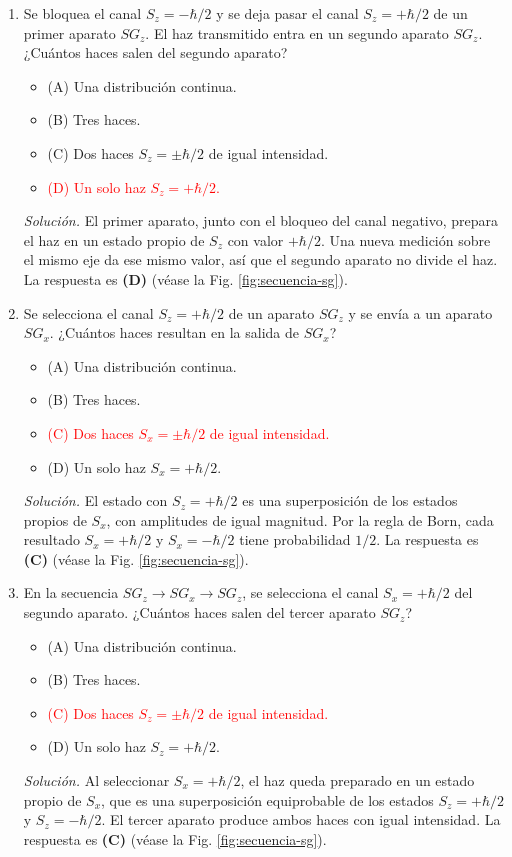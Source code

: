 \documentclass[11pt]{article}
\begin{document}
\begin{enumerate}
    \item Se bloquea el canal $S_z=-\hbar/2$ y se deja pasar el canal $S_z=+\hbar/2$ de un primer aparato $SG_z$. El haz transmitido entra en un segundo aparato $SG_z$. ¿Cuántos haces salen del segundo aparato?
    \begin{itemize}
        \item (A) Una distribución continua.
        \item (B) Tres haces.
        \item (C) Dos haces $S_z=\pm\hbar/2$ de igual intensidad.
        \item \textcolor{red}{(D) Un solo haz $S_z=+\hbar/2$.}
    \end{itemize}
    \textit{Solución.} El primer aparato, junto con el bloqueo del canal negativo, prepara el haz en un estado propio de $S_z$ con valor $+\hbar/2$. Una nueva medición sobre el mismo eje da ese mismo valor, así que el segundo aparato no divide el haz. La respuesta es \textbf{(D)} (véase la Fig. \ref{fig:secuencia-sg}). \parencite[Sec. 18.2.1, pp. 583--584]{chaparro2026}

    \item Se selecciona el canal $S_z=+\hbar/2$ de un aparato $SG_z$ y se envía a un aparato $SG_x$. ¿Cuántos haces resultan en la salida de $SG_x$?
    \begin{itemize}
        \item (A) Una distribución continua.
        \item (B) Tres haces.
        \item \textcolor{red}{(C) Dos haces $S_x=\pm\hbar/2$ de igual intensidad.}
        \item (D) Un solo haz $S_x=+\hbar/2$.
    \end{itemize}
    \textit{Solución.} El estado con $S_z=+\hbar/2$ es una superposición de los estados propios de $S_x$, con amplitudes de igual magnitud. Por la regla de Born, cada resultado $S_x=+\hbar/2$ y $S_x=-\hbar/2$ tiene probabilidad $1/2$. La respuesta es \textbf{(C)} (véase la Fig. \ref{fig:secuencia-sg}). \parencite[Secs. 18.2.1, 18.2.3 y 18.2.4, pp. 584, 593--596]{chaparro2026}

    \item En la secuencia $SG_z\to SG_x\to SG_z$, se selecciona el canal $S_x=+\hbar/2$ del segundo aparato. ¿Cuántos haces salen del tercer aparato $SG_z$?
    \begin{itemize}
        \item (A) Una distribución continua.
        \item (B) Tres haces.
        \item \textcolor{red}{(C) Dos haces $S_z=\pm\hbar/2$ de igual intensidad.}
        \item (D) Un solo haz $S_z=+\hbar/2$.
    \end{itemize}
    \textit{Solución.} Al seleccionar $S_x=+\hbar/2$, el haz queda preparado en un estado propio de $S_x$, que es una superposición equiprobable de los estados $S_z=+\hbar/2$ y $S_z=-\hbar/2$. El tercer aparato produce ambos haces con igual intensidad. La respuesta es \textbf{(C)} (véase la Fig. \ref{fig:secuencia-sg}). \parencite[Secs. 18.2.1, 18.2.3 y 18.2.4, pp. 585, 593--596]{chaparro2026}


\end{enumerate}
\end{document}
